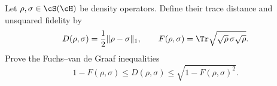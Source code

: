 Let $\rho,\sigma\in\cS(\cH)$ be density operators. Define their trace distance and unsquared fidelity by
$$
D(\rho,\sigma)=\frac{1}{2}\|\rho-\sigma\|_1,
\qquad
F(\rho,\sigma)=\Tr\sqrt{\sqrt{\rho}\,\sigma\sqrt{\rho}}.
$$
Prove the Fuchs--van de Graaf inequalities
$$
1-F(\rho,\sigma)
\leq
D(\rho,\sigma)
\leq
\sqrt{1-F(\rho,\sigma)^2}.
$$
